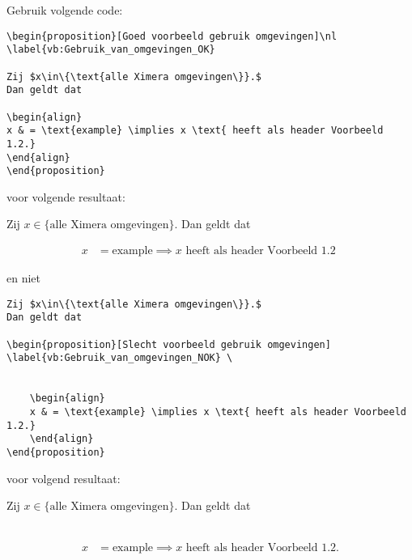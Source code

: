\documentclass{ximera}
\begin{document}
\begin{xmuitweiding}

Gebruik volgende code:

\begin{verbatim}
\begin{proposition}[Goed voorbeeld gebruik omgevingen]\nl
\label{vb:Gebruik_van_omgevingen_OK}  

Zij $x\in\{\text{alle Ximera omgevingen\}}.$
Dan geldt dat

\begin{align}
x & = \text{example} \implies x \text{ heeft als header Voorbeeld 1.2.}
\end{align} 
\end{proposition}

\end{verbatim}
voor volgende resultaat:
\begin{proposition}\nl \label{vb:Gebruik_van_omgevingen_OK} 
	
	Zij $x\in\{\text{alle Ximera omgevingen}\}.$
	Dan geldt dat
	
	\begin{align}
	 x & = \text{example} \implies x \text{ heeft als header Voorbeeld 1.2 }
	\end{align} 
\end{proposition}
en niet 

\begin{verbatim}
Zij $x\in\{\text{alle Ximera omgevingen\}}.$
Dan geldt dat

\begin{proposition}[Slecht voorbeeld gebruik omgevingen] 
\label{vb:Gebruik_van_omgevingen_NOK} \ 
	
	
	\begin{align}
	x & = \text{example} \implies x \text{ heeft als header Voorbeeld 1.2.}
	\end{align} 
\end{proposition}

\end{verbatim}

voor volgend resultaat:


Zij $x\in\{\text{alle Ximera omgevingen\}}.$
Dan geldt dat

\begin{proposition} \label{vb:Gebruik_van_omgevingen_NOK} \ 
	\begin{align}
	x & = \text{example} \implies x \text{ heeft als header Voorbeeld 1.2.}
	\end{align} 
\end{proposition}

\end{xmuitweiding} 
\end{document}
